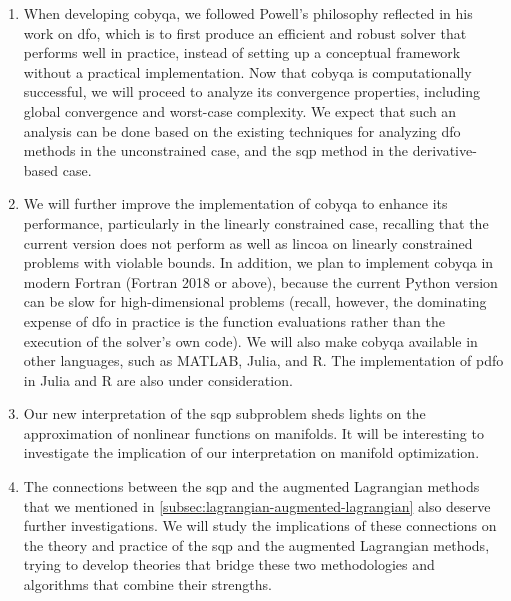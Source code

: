 \begin{enumerate}
    \item When developing \gls{cobyqa}, we followed Powell's philosophy reflected in his work on \gls{dfo}, which is to first produce an efficient and robust solver that performs well in practice, instead of setting up a conceptual framework without a practical implementation. 
    Now that \gls{cobyqa} is computationally successful, we will proceed to analyze its convergence properties, including global convergence and worst-case complexity.
    We expect that such an analysis can be done based on the existing techniques for analyzing \gls{dfo} methods in the unconstrained case, and the \gls{sqp} method in the derivative-based case.
    \item We will further improve the implementation of \gls{cobyqa} to enhance its performance, particularly in the linearly constrained case, recalling that the current version does not perform as well as \gls{lincoa} on linearly constrained problems with violable bounds.
    In addition, we plan to implement \gls{cobyqa} in modern Fortran (Fortran 2018 or above), because the current Python version can be slow for high-dimensional problems (recall, however, the dominating expense of \gls{dfo} in practice is the function evaluations rather than the execution of the solver's own code).
    We will also make \gls{cobyqa} available in other languages, such as MATLAB, Julia, and R.
    The implementation of \gls{pdfo} in Julia and R are also under consideration.
    \item Our new interpretation of the \gls{sqp} subproblem sheds lights on the approximation of nonlinear functions on manifolds.
    It will be interesting to investigate the implication of our interpretation on manifold optimization.
    \item The connections between the \gls{sqp} and the augmented Lagrangian methods that we mentioned in \cref{subsec:lagrangian-augmented-lagrangian} also deserve further investigations.
    We will study the implications of these connections on the theory and practice of the \gls{sqp} and the augmented Lagrangian methods, trying to develop theories that bridge these two methodologies and algorithms that combine their strengths.
\end{enumerate}
